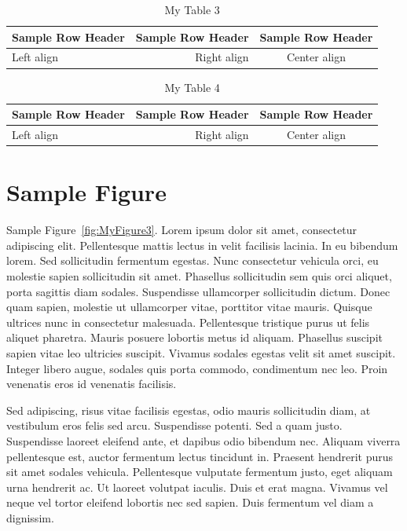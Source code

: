 \begin{table}[h]
	\caption{My Table 3}
	\begin{center}
		\begin{tabular}{| l | r | c |}
			\hline
			Sample Row Header & Sample Row Header & Sample Row Header \\\hline
			Left align & Right align & Center align \\\hline
		\end{tabular}
	\end{center}
	\label{tab:MyTable3}
\end{table}%

\begin{table}[h!]
	\caption{My Table 4}
	\begin{center}
		\begin{tabular}{| l | r | c |}
			\hline
			Sample Row Header & Sample Row Header & Sample Row Header \\\hline
			Left align & Right align & Center align \\\hline
		\end{tabular}
	\end{center}
	\label{tab:MyTable4}
\end{table}%


\section{Sample Figure}
\label{sec:intro:second:figure}
Sample Figure~\ref{fig:MyFigure3}. Lorem ipsum dolor sit amet, consectetur adipiscing elit. Pellentesque mattis lectus in velit facilisis lacinia. In eu bibendum lorem. Sed sollicitudin fermentum egestas. Nunc consectetur vehicula orci, eu molestie sapien sollicitudin sit amet. Phasellus sollicitudin sem quis orci aliquet, porta sagittis diam sodales. Suspendisse ullamcorper sollicitudin dictum. Donec quam sapien, molestie ut ullamcorper vitae, porttitor vitae mauris. Quisque ultrices nunc in consectetur malesuada. Pellentesque tristique purus ut felis aliquet pharetra. Mauris posuere lobortis metus id aliquam. Phasellus suscipit sapien vitae leo ultricies suscipit. Vivamus sodales egestas velit sit amet suscipit. Integer libero augue, sodales quis porta commodo, condimentum nec leo. Proin venenatis eros id venenatis facilisis.

Sed adipiscing, risus vitae facilisis egestas, odio mauris sollicitudin diam, at vestibulum eros felis sed arcu. Suspendisse potenti. Sed a quam justo. Suspendisse laoreet eleifend ante, et dapibus odio bibendum nec. Aliquam viverra pellentesque est, auctor fermentum lectus tincidunt in. Praesent hendrerit purus sit amet sodales vehicula. Pellentesque vulputate fermentum justo, eget aliquam urna hendrerit ac. Ut laoreet volutpat iaculis. Duis et erat magna. Vivamus vel neque vel tortor eleifend lobortis nec sed sapien. Duis fermentum vel diam a dignissim. 

